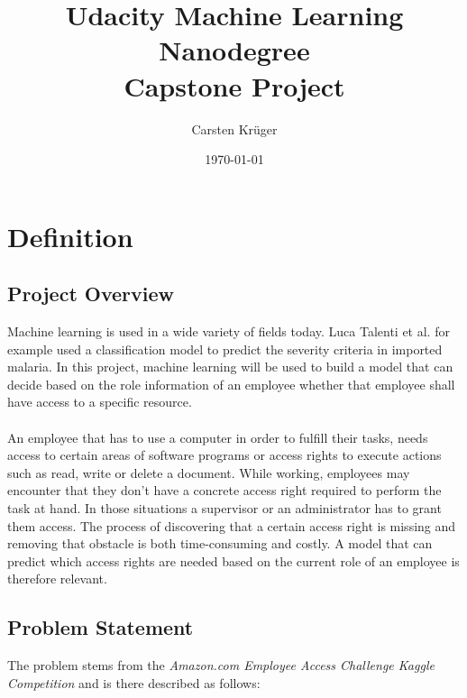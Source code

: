 \documentclass[11pt]{article}
\title{Udacity Machine Learning Nanodegree \\ Capstone Project}
\author{Carsten Kr\"uger}
\date{\today}
\begin{document}

\maketitle

\section{Definition}

\subsection{Project Overview}

Machine learning is used in a wide variety of fields today. 
Luca Talenti et al. \cite{malaria} for example used a classification model to predict 
the severity criteria in imported malaria. In this project, machine learning will be used
to build a model that can decide based on the role information of an employee whether
that employee shall have access to a specific resource. 
\\ \\
An employee that has to use a computer in order to fulfill their tasks, needs access 
to certain areas of software programs or access rights to execute actions such as read, 
write or delete a document. While working, employees may encounter that they don't have a 
concrete access right required to perform the task at hand. In those situations a supervisor or an 
administrator has to grant them access. The process of discovering that a certain access 
right is missing and removing that obstacle is both time-consuming and costly.
A model that can predict which access rights are needed based on the current role of an 
employee is therefore relevant.
    
\subsection{Problem Statement}

The problem stems from the {\it Amazon.com Employee Access Challenge Kaggle Competition} 
\cite{kaggleAmazon} and is there described as follows:
\end{document}

